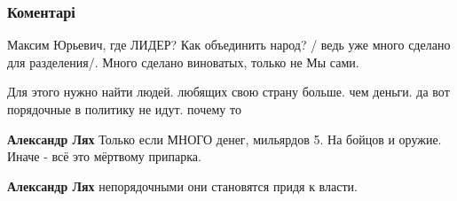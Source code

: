  
 
 
 
 
\subsubsection{Коментарі}

\begin{itemize}
 
Максим Юрьевич, где ЛИДЕР?
Как объединить народ? / ведь уже много сделано для разделения/.
Много сделано виноватых, только не Мы сами.

 
Для этого нужно найти людей. любящих свою страну больше. чем деньги. да вот порядочные в политику не идут. почему то

\begin{itemize}

 
\textbf{Александр Лях} Только если МНОГО денег, мильярдов 5. На бойцов и оружие. Иначе - всё это мёртвому припарка.

 
\textbf{Александр Лях} непорядочными они становятся придя к власти.

 

\end{itemize}
\end{itemize}
